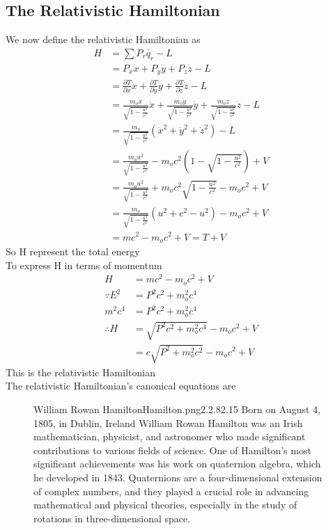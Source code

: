 \subsection{The Relativistic Hamiltonian}
We now define the relativistic Hamiltonian as 
\begin{align*}
    H &= \sum P_r\dot{q_r}  - L\\
      &= P_x\dot{x} + P_y\dot{y} + P_z\dot{z} - L\\
      &= \frac{\partial T}{\partial \dot{x}}\dot{x} + \frac{\partial T}{\partial \dot{y}}\dot{y} + \frac{\partial T}{\partial \dot{z}}\dot{z} -L\\
      &= \frac{m_o \dot{x}}{\sqrt{1 - \frac{u^2}{c^2}}}\dot{x} + \frac{m_o \dot{y}}{\sqrt{1 - \frac{u^2}{c^2}}}\dot{y} + \frac{m_o \dot{z}}{\sqrt{1 - \frac{u^2}{c^2}}}\dot{z} -L \\
      &= \frac{m_o}{\sqrt{1 - \frac{u^2}{c^2}}} \left(\dot{x}^2 + \dot{y}^2 + \dot{z}^2\right) - L\\
      &= \frac{m_o u^2}{\sqrt{1 - \frac{u^2}{c^2}}} - m_o c^2\left(1- \sqrt{1 - \frac{u^2}{c^2}}\right) + V\\
      &= \frac{m_o u^2}{\sqrt{1 - \frac{u^2}{c^2}}} + m_o c^2 \sqrt{1 - \frac{u^2}{c^2}} - m_o c^2  + V\\
      &= \frac{m_o}{\sqrt{1 - \frac{u^2}{c^2}}}\left(u^2 + c^2 - u^2\right) - m_o c^2  + V\\
      &= m c^2 - m_o c^2  + V = T + V
\end{align*}
So H represent the total energy \\
To express H in terms of momentum
\begin{align*}
    H &= m c^2 - m_o c^2  + V \\  
    \because E^2 &= P^2c^2 + m_o^2 c^4 \\
    m^2 c^4 &= P^2c^2 + m_o^2 c^4 \\
    \therefore H &= \sqrt{P^2c^2 + m_o^2 c^4} - m_o c^2  + V\\
    &= c\sqrt{P^2 + m_o^2 c^2} - m_o c^2  + V
\end{align*}
This is the relativistic Hamiltonian\\
The relativistic Hamiltonian's canonical equations are 
\begin{figure}[b]
\begin{enrichment}{William Rowan Hamilton}{Hamilton.png}{2.2}{.82}{.15}
    Born on August 4, 1805, in Dublin, Ireland William Rowan Hamilton was an Irish mathematician, physicist, and astronomer who made significant contributions to various fields of science.
    One of Hamilton's most significant achievements was his work on quaternion algebra, which he developed in 1843. Quaternions are a four-dimensional extension of complex numbers, and they played a crucial role in advancing mathematical and physical theories, especially in the study of rotations in three-dimensional space.
\end{enrichment}
\end{figure}
